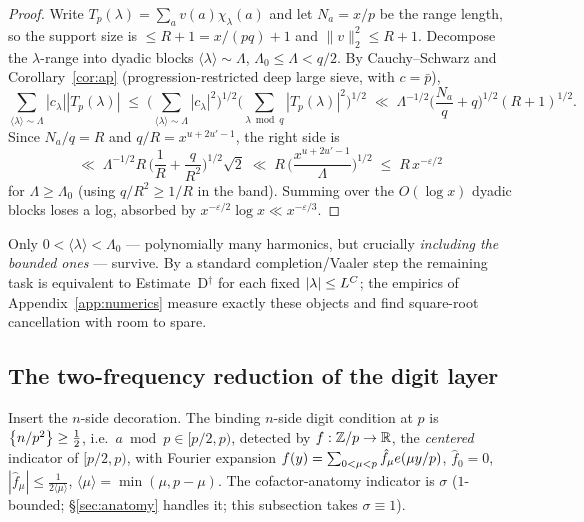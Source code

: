\begin{proof}
Write $T_p(\lambda)=\sum_av(a)\chi_\lambda(a)$ and let
$N_a=x/p$ be the range length, so the support size is
$\le R+1=x/(pq)+1$ and $\|v\|_2^2\le R+1$. Decompose the $\lambda$-range
into dyadic blocks $\langle\lambda\rangle\sim\Lambda$,
$\Lambda_0\le\Lambda<q/2$. By Cauchy--Schwarz and
Corollary~\ref{cor:ap} (progression-restricted deep large sieve, with
$c=\bar p$),
\[
\sum_{\langle\lambda\rangle\sim\Lambda}|c_\lambda||T_p(\lambda)|
\;\le\;\Big(\sum_{\langle\lambda\rangle\sim\Lambda}|c_\lambda|^2\Big)^{1/2}
\Big(\sum_{\lambda\bmod q}|T_p(\lambda)|^2\Big)^{1/2}
\;\ll\;\Lambda^{-1/2}\Big(\frac{N_a}{q}+q\Big)^{1/2}(R+1)^{1/2}.
\]
Since $N_a/q=R$ and $q/R=x^{u+2u'-1}$, the right side is
\[
\ll\;\Lambda^{-1/2}R\,\Big(\frac1R+\frac{q}{R^2}\Big)^{1/2}\sqrt{2}
\;\ll\;R\,\Big(\frac{x^{u+2u'-1}}{\Lambda}\Big)^{1/2}
\;\le\;R\,x^{-\varepsilon/2}
\]
for $\Lambda\ge\Lambda_0$ (using $q/R^2\ge1/R$ in the band). Summing over
the $O(\log x)$ dyadic blocks loses a log, absorbed by
$x^{-\varepsilon/2}\log x\ll x^{-\varepsilon/3}$.
\end{proof}

\begin{remark}
Only $0<\langle\lambda\rangle<\Lambda_0$ --- polynomially many harmonics,
but crucially \emph{including the bounded ones} --- survive. By a
standard completion/Vaaler step the remaining task is equivalent to
Estimate~D$^\dagger$ for each fixed $|\lambda|\le L^{C}$; the empirics
of Appendix~\ref{app:numerics} measure exactly these objects and find
square-root cancellation with room to spare.
\end{remark}

\subsection{The two-frequency reduction of the digit layer}

Insert the $n$-side decoration. The binding $n$-side digit condition at
$p$ is $\left\{n/p^2\right\}\ge\tfrac12$, i.e.\ $a\bmod p\in[p/2,p)$, detected by
$f:\mathbb{Z}/p\to\mathbb{R}$, the \emph{centered} indicator of $[p/2,p)$, with Fourier
expansion $f(y)=\sum_{0<\mu<p}\hat f_\mu e\!\left(\mu y/p\right)$,
$\hat f_0=0$, $|\hat f_\mu|\le\tfrac1{2\langle\mu\rangle}$,
$\langle\mu\rangle=\min(\mu,p-\mu)$. The cofactor-anatomy indicator is
$\sigma$ ($1$-bounded; \S\ref{sec:anatomy} handles it; this subsection
takes $\sigma\equiv1$).

